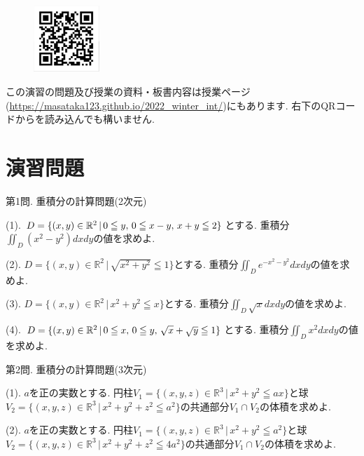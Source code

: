 \documentclass[dvipdfmx,a4paper,11pt]{article}
\newcommand{\R}{\mathbb{R}}
\theoremstyle{definition}
\begin{document}
 \vspace{11pt}
\begin{figure}
  \centering
 \includegraphics[height=25mm, width=25mm]{cal2.png}
\end{figure}

この演習の問題及び授業の資料・板書内容は授業ページ(\url{https://masataka123.github.io/2022_winter_int/})にもあります. 
右下のQRコードからを読み込んでも構いません.

\newpage 
\section{演習問題}

\hspace{11pt}
{\Large 第1問.} 重積分の計算問題(2次元)
\vspace{11pt}

{\large(1). $D=\{ (x,y) \in \R^2 \,|\, 0 \leqq y, \text{\,} 0 \leqq x-y, \text{\,} x+y \leqq 2\}$とする.
重積分$\iint_{D} (x^2-y^2)dxdy$の値を求めよ.}\vspace{5pt}

{\large(2). $D= \{ (x,y)\in \R^2 \,|\, \sqrt{x^2 + y^2 } \leqq 1  \}$とする. 
重積分$\iint_{D} e^{-x^2-y^2}dxdy$の値を求めよ.}\vspace{5pt}

{\large(3). $D=\{ (x,y) \in \R^2  \,|\, x^2 + y^2 \leqq x\}$とする.
重積分$\iint_{D} \sqrt{x}dxdy$の値を求めよ.}\vspace{5pt}

{\large(4). $D=\{ (x,y) \in \R^2 \,|\, 0 \leqq x, \text{\,}  0 \leqq y,\text{\,} \sqrt{x} + \sqrt{y} \leqq 1\}$とする.
重積分$\iint_{D} x^2dxdy$の値を求めよ.}

\vspace{22pt}
{\Large 第2問.} 重積分の計算問題(3次元) 
\vspace{11pt}

{\large(1). $a$を正の実数とする. 円柱$V_1= \{ (x,y,z) \in \R^3 \,|\,x^2 + y^2 \leqq ax\}$と球$V_2 = \{ (x,y,z) \in \R^3 \,|\, x^2 + y^2 + z^2 \leqq a^2 \}$の共通部分$V_1 \cap V_2$の体積を求めよ.}\vspace{4pt}

{\large(2). $a$を正の実数とする. 円柱$V_1= \{ (x,y,z) \in \R^3 \,|\,x^2 + y^2 \leqq a^2\}$と球$V_2 = \{ (x,y,z) \in \R^3 \,|\, x^2 + y^2 + z^2 \leqq 4a^2 \}$の共通部分$V_1 \cap V_2$の体積を求めよ.}\vspace{4pt}
\end{document}
